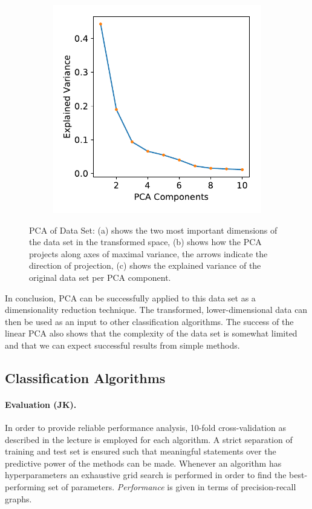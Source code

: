 \documentclass[12pt, a4paper]{scrartcl}
\begin{document}
\begin{figure}
\begin{subfigure}[b]{0.3\textwidth}
        \caption{}
        \label{fig:pca2}
    \end{subfigure}
    \begin{subfigure}[b]{0.3\textwidth}
        \includegraphics[width=\textwidth]{pca_2}
        \caption{}
        \label{fig:pca3}
    \end{subfigure}
    \caption{PCA of Data Set: (a) shows the two most important dimensions of the data set in the transformed space, (b) shows how the PCA projects along axes of maximal variance, the arrows indicate the direction of projection, (c) shows the explained variance of the original data set per PCA component.}\label{fig:pca}
\end{figure}

In conclusion, PCA can be successfully applied to this data set as a dimensionality reduction technique. The transformed, lower-dimensional data can then be used as an input to other classification algorithms. The success of the linear PCA also shows that the complexity of the data set is somewhat limited and that we can expect successful results from simple methods.

\subsection{Classification Algorithms}
\paragraph{Evaluation (JK).} In order to provide reliable performance analysis, 10-fold cross-validation as described in the lecture is employed for each algorithm. A strict separation of training and test set is ensured such that meaningful statements over the predictive power of the methods can be made.
Whenever an algorithm has hyperparameters an exhaustive grid search is performed in order to find the best-performing set of parameters. \emph{Performance} is given in terms of precision-recall graphs. 
\end{document}
